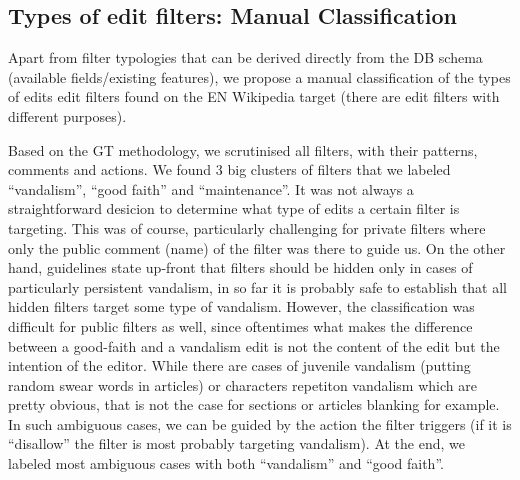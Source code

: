 \documentclass{sigchi}
\begin{document}

\subsection{Types of edit filters: Manual Classification}

Apart from filter typologies that can be derived directly from the DB schema (available fields/existing features), we propose a manual classification of the types of edits edit filters found on the EN Wikipedia target (there are edit filters with different purposes).

Based on the GT methodology, we scrutinised all filters, with their patterns, comments and actions.
We found 3 big clusters of filters that we labeled ``vandalism'', ``good faith'' and ``maintenance''.
It was not always a straightforward desicion to determine what type of edits a certain filter is targeting.
This was of course, particularly challenging for private filters where only the public comment (name) of the filter was there to guide us.
On the other hand, guidelines state up-front that filters should be hidden only in cases of particularly persistent vandalism, in so far it is probably safe to establish that all hidden filters target some type of vandalism.
However, the classification was difficult for public filters as well, since oftentimes what makes the difference between a good-faith and a vandalism edit is not the content of the edit but the intention of the editor.
While there are cases of juvenile vandalism (putting random swear words in articles) or characters repetiton vandalism which are pretty obvious, that is not the case for sections or articles blanking for example.
In such ambiguous cases, we can be guided by the action the filter triggers (if it is ``disallow'' the filter is most probably targeting vandalism).
At the end, we labeled most ambiguous cases with both ``vandalism'' and ``good faith''.
\end{document}
